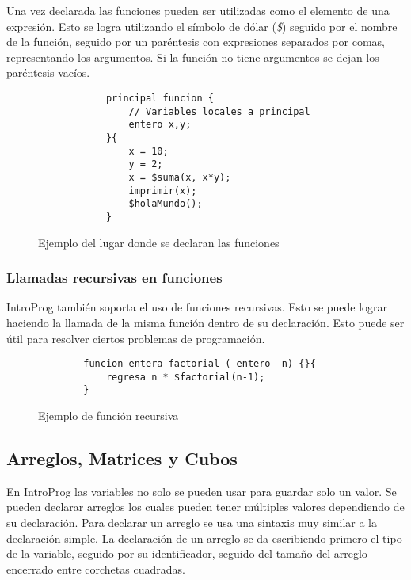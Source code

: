 Una vez declarada las funciones pueden ser utilizadas como el elemento de una expresión. Esto se logra utilizando el símbolo de dólar (\emph{\$}) seguido por el nombre de la función, seguido por un paréntesis con expresiones separados por comas, representando los argumentos. Si la función no tiene argumentos se dejan los paréntesis vacíos.

\begin{figure}[!htbp]
    \centering
   
    \begin{lstlisting}
            principal funcion {
                // Variables locales a principal
                entero x,y;
            }{
                x = 10;
                y = 2;
                x = $suma(x, x*y);
                imprimir(x);
                $holaMundo();
            }
    \end{lstlisting}
     \caption{Ejemplo del lugar donde se declaran las funciones}
\end{figure}
\FloatBarrier
\subsubsection{Llamadas recursivas en funciones}

IntroProg también soporta el uso de funciones recursivas. Esto se puede lograr haciendo la llamada de la misma función dentro de su declaración. Esto puede ser útil para resolver ciertos problemas de programación.

\begin{figure}[!htbp]
    \centering
    
    \begin{lstlisting}
        funcion entera factorial ( entero  n) {}{
            regresa n * $factorial(n-1);
        } 
    \end{lstlisting}
    \caption{Ejemplo de función recursiva}
\end{figure}


\FloatBarrier
\subsection{Arreglos, Matrices y Cubos}

En IntroProg las variables no solo se pueden usar para guardar solo un valor. Se pueden declarar arreglos los cuales pueden tener múltiples valores dependiendo de su declaración. Para declarar un arreglo se usa una sintaxis muy similar a la declaración simple. La declaración de un arreglo se da escribiendo primero el tipo de la variable, seguido por su identificador, seguido del tamaño del arreglo encerrado entre corchetas cuadradas.\\

